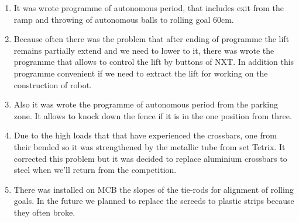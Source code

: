 \begin{enumerate}
	\item It was wrote programme of autonomous period, that includes exit from the ramp and throwing of autonomous balls to rolling goal 60cm.
	
	\item Because often there was the problem that after ending of programme the lift remains partially extend and we need to lower to it, there was wrote the programme that allows to control the lift by buttons of NXT. In addition this programme convenient if we need to extract the lift for working on the construction of robot.
	
	\item Also it was wrote the programme of autonomous period from the parking zone. It allows to knock down the fence if it is in the one position from three.
	
	\item Due to the high loads that that have experienced the crossbars, one from their bended so it was strengthened by the metallic tube from set Tetrix. It corrected this problem but it was decided to replace aluminium crossbars to steel when we'll return from the competition.
	
	
	\item There was installed on MCB the slopes of the tie-rods for alignment of rolling goals. In the future we planned to replace the screeds  to plastic strips because they often broke.
	

\end{enumerate}
